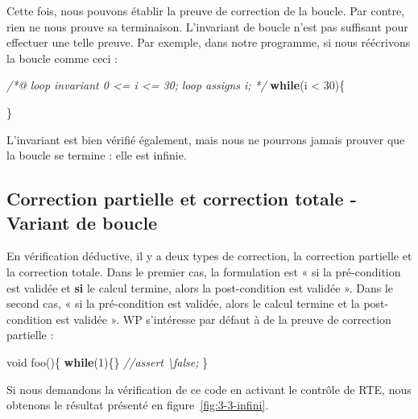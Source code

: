 \documentclass[12pt,francais,]{scrbook}
\newenvironment{Shaded}{}{}
\newcommand{\KeywordTok}[1]{\textcolor[rgb]{0.00,0.44,0.13}{\textbf{{#1}}}}
\newcommand{\DataTypeTok}[1]{\textcolor[rgb]{0.56,0.13,0.00}{{#1}}}
\newcommand{\DecValTok}[1]{\textcolor[rgb]{0.25,0.63,0.44}{{#1}}}
\newcommand{\CommentTok}[1]{\textcolor[rgb]{0.38,0.63,0.69}{\textit{{#1}}}}
\newcommand{\NormalTok}[1]{{#1}}
\begin{document}
Cette fois, nous pouvons établir la preuve de correction de la boucle.
Par contre, rien ne nous prouve sa terminaison. L'invariant de boucle
n'est pas suffisant pour effectuer une telle preuve. Par exemple, dans
notre programme, si nous réécrivons la boucle comme ceci :

\begin{footnotesize}\begin{Shaded}
\begin{Highlighting}[]
\CommentTok{/*@}
\CommentTok{  loop invariant 0 <= i <= 30;}
\CommentTok{  loop assigns i;}
\CommentTok{*/}
\KeywordTok{while}\NormalTok{(i < }\DecValTok{30}\NormalTok{)\{}
   
\NormalTok{\}}
\end{Highlighting}
\end{Shaded}\end{footnotesize}

L'invariant est bien vérifié également, mais nous ne pourrons jamais
prouver que la boucle se termine : elle est infinie.

\subsection{Correction partielle et correction totale - Variant de
boucle}\label{correction-partielle-et-correction-totale---variant-de-boucle}

En vérification déductive, il y a deux types de correction, la
correction partielle et la correction totale. Dans le premier cas, la
formulation est « si la pré-condition est validée et \textbf{si} le
calcul termine, alors la post-condition est validée ». Dans le second
cas, « si la pré-condition est validée, alors le calcul termine et la
post-condition est validée ». WP s'intéresse par défaut à de la preuve
de correction partielle :

\begin{footnotesize}\begin{Shaded}
\begin{Highlighting}[]
\DataTypeTok{void} \NormalTok{foo()\{}
  \KeywordTok{while}\NormalTok{(}\DecValTok{1}\NormalTok{)\{\}}
  \CommentTok{//assert \textbackslash{}false;}
\NormalTok{\}}
\end{Highlighting}
\end{Shaded}\end{footnotesize}

Si nous demandons la vérification de ce code en activant le contrôle de
RTE, nous obtenons le résultat présenté en figure~\ref{fig:3-3-infini}.
\end{document}
